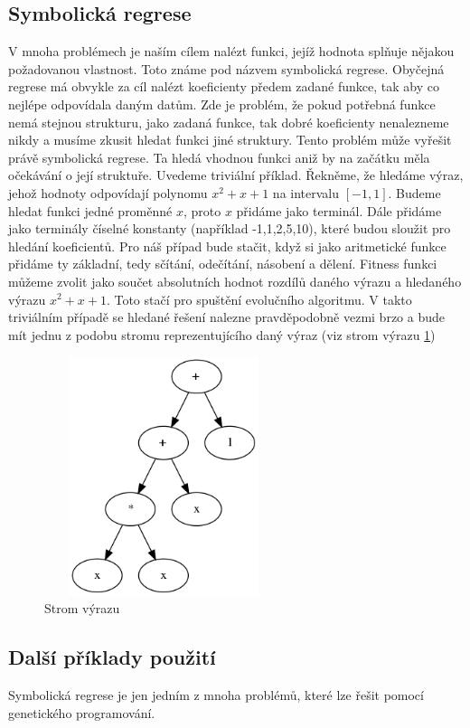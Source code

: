\subsection{Symbolická regrese}
V mnoha problémech je naším cílem nalézt funkci, jejíž hodnota splňuje nějakou požadovanou vlastnost. Toto známe pod názvem symbolická regrese.
Obyčejná regrese má obvykle za cíl nalézt koeficienty předem zadané funkce, tak aby co nejlépe odpovídala daným datům.
Zde je problém, že pokud potřebná funkce nemá stejnou strukturu, jako zadaná funkce, tak dobré koeficienty nenalezneme nikdy a musíme zkusit hledat funkci jiné struktury.
Tento problém může vyřešit právě symbolická regrese. Ta hledá vhodnou funkci aniž by na začátku měla očekávání o její struktuře.
Uvedeme triviální příklad. Řekněme, že hledáme výraz, jehož hodnoty odpovídají polynomu $x^2+x+1$ na intervalu $[-1,1]$.
Budeme hledat funkci jedné proměnné $x$, proto $x$ přidáme jako terminál. Dále přidáme jako terminály číselné konstanty (například -1,1,2,5,10), které budou sloužit pro hledání koeficientů.
Pro náš případ bude stačit, když si jako aritmetické funkce přidáme ty základní, tedy sčítání, odečítání, násobení a dělení.
Fitness funkci můžeme zvolit jako součet absolutních hodnot rozdílů daného výrazu a hledaného výrazu $x^2+x+1$.
Toto stačí pro spuštění evolučního algoritmu. 
V takto triviálním případě se hledané řešení nalezne pravděpodobně vezmi brzo a bude mít jednu z podobu stromu reprezentujícího daný výraz (viz strom výrazu \ref{obr04:GrafFormule})


\begin{figure}[p]\centering
\includegraphics[width=70mm, height=70mm]{./Obrazky/formule_graph_2.png}
\caption{Strom výrazu}
\label{obr04:GrafFormule}
\end{figure}


\subsection{Další příklady použití}
Symbolická regrese je jen jedním z mnoha problémů, které lze řešit pomocí genetického programování.

